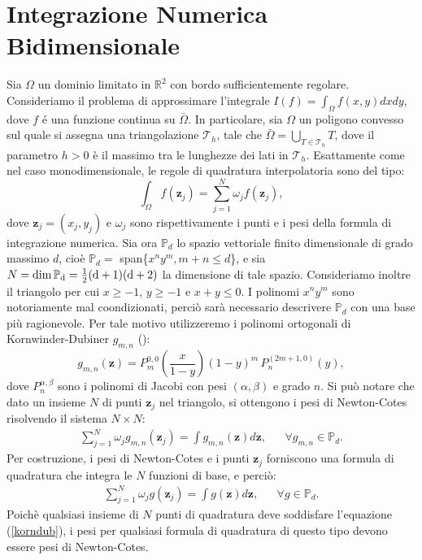 \documentclass[10pt]{amsart}
\begin{document}
\section{Integrazione Numerica Bidimensionale}
Sia $\Omega$ un dominio limitato in $\mathbb{R}^2$ con bordo sufficientemente regolare. Consideriamo il problema di approssimare l'integrale $I(f) = \int_{\Omega} f(x,y) dxdy$, dove $f$ \'e una funzione continua su $\bar{\Omega}$. In particolare, sia $\Omega$ un poligono convesso sul quale si assegna una triangolazione $\mathcal{T}_h$, tale che $\bar{\Omega} = \bigcup_{T \in \mathcal{T}_h} T$, dove il parametro $h > 0$ \`e il massimo tra le lunghezze dei lati in $\mathcal{T}_h$. Esattamente come nel caso monodimensionale, le regole di quadratura interpolatoria sono del tipo:
\begin{equation}
\int_{\Omega} f(\mathbf{z}_j) = \sum_{j=1}^N \omega_j f(\mathbf{z}_j),
\end{equation}
dove $\mathbf{z}_j=(x_j,y_j)$ e $\omega_j$ sono rispettivamente i punti e i pesi della formula di integrazione numerica. Sia ora $\mathbb{P}_d$ lo spazio vettoriale finito dimensionale di grado massimo $d$, cio\`e $\mathbb{P}_d =$ span\{$x^n y^m, m+n \le d$\}, e sia $N = \rm{dim}\,\mathbb{P}_d = \frac{1}{2} (d+1)(d+2)$ la dimensione di tale spazio. Consideriamo inoltre il triangolo per cui $x\ge -1$, $y\ge -1$ e $x+y \le 0$. I polinomi $x^n y^m$ sono notoriamente mal coondizionati, perci\`o sar\`a necessario descrivere $\mathbb{P}_d$ con una base pi\`u ragionevole. Per tale motivo utilizzeremo i polinomi ortogonali di Kornwinder-Dubiner ${g_{m,n}}$ (\cite{}):
\begin{equation}
g_{m,n} (\mathbf{z}) = P_m^{0,0} \left(\frac{x}{1-y}\right)(1-y)^m \, P_n^(2m+1,0) (y),
\end{equation}
dove $P_n^{\alpha,\beta}$ sono i polinomi di Jacobi con pesi $(\alpha,\beta)$ e grado $n$. Si pu\`o notare che dato un insieme $N$ di punti ${\mathbf{z}_j}$ nel triangolo, si ottengono i pesi di Newton-Cotes risolvendo il sistema $N \times N$:
\begin{eqnarray}
\label{korndub}
\sum_{j=1}^N \omega_j g_{m,n}(\mathbf{z}_j) = \int g_{m,n}(\mathbf{z}) d\mathbf{z}, & & \forall g_{m,n} \in \mathbb{P}_d. 
\end{eqnarray}
Per costruzione, i pesi di Newton-Cotes e i punti ${\mathbf{z}_j}$ forniscono una formula di quadratura che integra le $N$ funzioni di base, e perci\`o:
\begin{eqnarray}
\sum_{j=1}^N \omega_j g(\mathbf{z}_j) = \int g (\mathbf{z}) d\mathbf{z}, & & \forall g \in \mathbb{P}_d.
\end{eqnarray}
Poich\`e qualsiasi insieme di $N$ punti di quadratura deve soddisfare l'equazione (\ref{korndub}), i pesi per qualsiasi formula di quadratura di questo tipo devono essere pesi di Newton-Cotes. 
\end{document}
